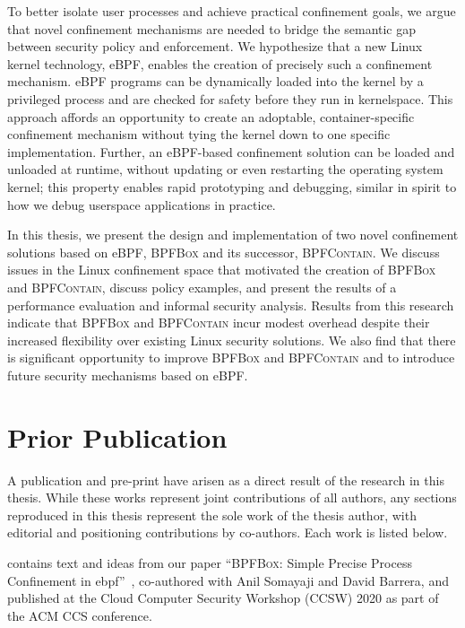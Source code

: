 \documentclass[
  fontsize=12pt,
  titlepage=firstiscover,
  paper=letter,
oneside,
  cleardoublepage=plain,
  parskip=half-,
  DIV=10,
  parindent,
  appendixprefix,
  chapterprefix,
  listof=totoc,
]{scrbook}
\newcommand{\bpfbox}{\textsc{BPFBox}}
\newcommand{\bpfcontain}{\textsc{BPFContain}}
\begin{document}
To better isolate user processes and achieve practical confinement goals, we argue that
novel confinement mechanisms are needed to bridge the semantic gap between security policy
and enforcement. We hypothesize that a new Linux kernel technology, eBPF, enables the
creation of precisely such a confinement mechanism. eBPF programs can be dynamically
loaded into the kernel by a privileged process and are checked for safety before they run
in kernelspace.  This approach affords an opportunity to create an adoptable,
container-specific confinement mechanism without tying the kernel down to one specific
implementation.  Further, an eBPF-based confinement solution can be loaded and unloaded at
runtime, without updating or even restarting the operating system kernel; this property
enables rapid prototyping and debugging, similar in spirit to how we debug userspace
applications in practice.

In this thesis, we present the design and implementation of two novel confinement
solutions based on eBPF, \bpfbox{} and its successor, \bpfcontain{}. We discuss issues in
the Linux confinement space that motivated the creation of \bpfbox{} and \bpfcontain{},
discuss policy examples, and present the results of a performance evaluation and informal
security analysis. Results from this research indicate that \bpfbox{} and \bpfcontain{}
incur modest overhead despite their increased flexibility over existing Linux security
solutions.  We also find that there is significant opportunity to improve \bpfbox{} and
\bpfcontain{} and to introduce future security mechanisms based on eBPF\@.

\endgroup
\cleardoublepage 









\chapter*{Prior Publication}\begingroup
\small
A publication and pre-print have arisen as a direct result of the research in this thesis.
While these works represent joint contributions of all authors, any sections reproduced in
this thesis represent the sole work of the thesis author, with editorial and positioning
contributions by co-authors. Each work is listed below.

 contains text and ideas from our paper \enquote{\bpfbox{}: Simple Precise
Process Confinement in \gls{ebpf}}~\cite{findlay2020_bpfbox}, co-authored with Anil
Somayaji and David Barrera, and published at the Cloud Computer Security Workshop (CCSW)
2020 as part of the ACM CCS conference.
\end{document}
